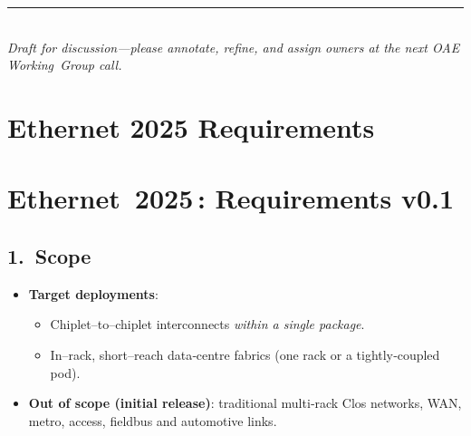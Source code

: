 \documentclass[HFT-main.tex]{subfiles}
\begin{document}
\vfill
\begin{center}
\rule{0.6\linewidth}{0.4pt}\\
\footnotesize
\textit{Draft for discussion—please annotate, refine, and assign owners at the next OAE Working Group call.}
\end{center}
 
 
 
 
\section{Ethernet 2025 Requirements}

\section*{Ethernet 2025\,: Requirements v0.1}

\subsection*{1.\ Scope}
\begin{itemize}
  \item \textbf{Target deployments}:  
        \begin{itemize}
            \item Chiplet–to–chiplet interconnects \emph{within a single package}.  
            \item In–rack, short–reach data‑centre fabrics (one rack or a tightly‑coupled pod).  
        \end{itemize}
  \item \textbf{Out of scope (initial release)}:  
        traditional multi‑rack Clos networks, WAN, metro, access, fieldbus and automotive links.
\end{itemize}
\end{document}
